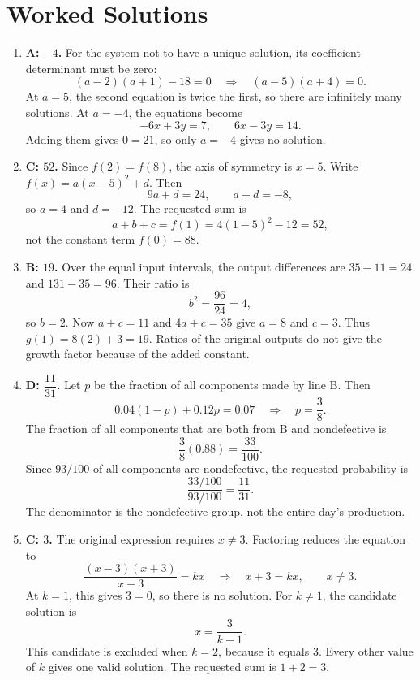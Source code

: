 \documentclass[12pt]{article}
\begin{document}
\section*{Worked Solutions}
\begin{enumerate}[leftmargin=*,itemsep=1em]
  \item \textbf{A: $-4$.} For the system not to have a unique solution, its coefficient determinant must be zero:
  \[
    (a-2)(a+1)-18=0
    \quad\Longrightarrow\quad (a-5)(a+4)=0.
  \]
  At $a=5$, the second equation is twice the first, so there are infinitely many solutions. At $a=-4$, the equations become
  \[
    -6x+3y=7,\qquad 6x-3y=14.
  \]
  Adding them gives $0=21$, so only $\boxed{a=-4}$ gives no solution.

  \vfill
  \item \textbf{C: $52$.} Since $f(2)=f(8)$, the axis of symmetry is $x=5$. Write $f(x)=a(x-5)^2+d$. Then
  \[
    9a+d=24,\qquad a+d=-8,
  \]
  so $a=4$ and $d=-12$. The requested sum is
  \[
    a+b+c=f(1)=4(1-5)^2-12=\boxed{52},
  \]
  not the constant term $f(0)=88$.

  \vfill
  \item \textbf{B: $19$.} Over the equal input intervals, the output differences are $35-11=24$ and $131-35=96$. Their ratio is
  \[
    b^2=\frac{96}{24}=4,
  \]
  so $b=2$. Now $a+c=11$ and $4a+c=35$ give $a=8$ and $c=3$. Thus $g(1)=8(2)+3=\boxed{19}$. Ratios of the original outputs do not give the growth factor because of the added constant.

  \vfill
  \newpage
  \item \textbf{D: $\dfrac{11}{31}$.} Let $p$ be the fraction of all components made by line B. Then
  \[
    0.04(1-p)+0.12p=0.07
    \quad\Longrightarrow\quad p=\frac38.
  \]
  The fraction of all components that are both from B and nondefective is
  \[
    \frac38(0.88)=\frac{33}{100}.
  \]
  Since $93/100$ of all components are nondefective, the requested probability is
  \[
    \frac{33/100}{93/100}=\boxed{\frac{11}{31}}.
  \]
  The denominator is the nondefective group, not the entire day's production.

  \vfill
  \item \textbf{C: $3$.} The original expression requires $x\ne3$. Factoring reduces the equation to
  \[
    \frac{(x-3)(x+3)}{x-3}=kx
    \quad\Longrightarrow\quad x+3=kx,\qquad x\ne3.
  \]
  At $k=1$, this gives $3=0$, so there is no solution. For $k\ne1$, the candidate solution is
  \[
    x=\frac{3}{k-1}.
  \]
  This candidate is excluded when $k=2$, because it equals 3. Every other value of $k$ gives one valid solution. The requested sum is $\boxed{1+2=3}$.


\end{enumerate}
\end{document}
